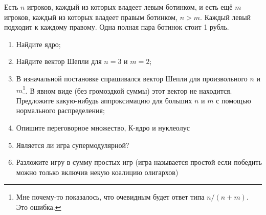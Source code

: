 \begin{problem}[Ботинки-2.]

Есть $n$ игроков, каждый из которых владеет левым ботинком, и есть ещё $m$ игроков, каждый из которых владеет правым ботинком, $n>m$. Каждый левый подходит к каждому правому. Одна полная пара ботинок стоит 1 рубль.

\begin{enumerate}
\item Найдите ядро;

\item Найдите вектор Шепли для $n=3$ и $m=2$;

\item В изначальной постановке спрашивался вектор Шепли для произвольного $n$ и $m$\footnote{Мне почему-то показалось, что очевидным будет ответ типа $n/(n+m)$. Это ошибка.}. В явном виде (без громоздкой суммы) этот вектор не находится. Предложите какую-нибудь аппроксимацию для больших $n$ и $m$ с помощью нормального распределения;

\item Опишите переговорное множество, К-ядро и нуклеолус

\item Является ли игра супермодулярной?

\item Разложите игру в сумму простых игр (игра называется простой если победить можно только включив некую коалицию олигархов)
\end{enumerate}



\begin{sol}

\end{sol}
\end{problem}



